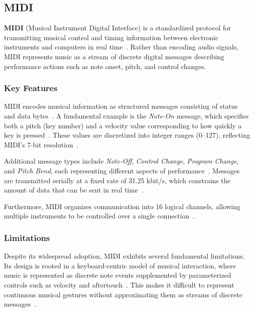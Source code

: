 \subsection{MIDI}\label{subsec:midi}

\textbf{MIDI} (Musical Instrument Digital Interface) is a standardized protocol for transmitting musical
control and timing information between electronic instruments and computers in real time~\cite{Moog_1986}.
Rather than encoding audio signals, MIDI represents music as a stream of discrete digital messages describing
performance actions such as note onset, pitch, and control changes.


\subsubsection{Key Features}

MIDI encodes musical information as structured messages consisting of status and data bytes~\cite{Moog_1986}.
A fundamental example is the \textit{Note-On} message, which specifies both a pitch (key number) and a
velocity value corresponding to how quickly a key is pressed~\cite{Moog_1986}.
These values are discretized into integer ranges (0–127), reflecting MIDI’s 7-bit resolution~\cite{Moog_1986}.

Additional message types include \textit{Note-Off}, \textit{Control Change}, \textit{Program Change}, and
\textit{Pitch Bend}, each representing different aspects of performance~\cite{Moog_1986}.
Messages are transmitted serially at a fixed rate of 31.25 kbit/s, which constrains the amount of data that
can be sent in real time~\cite{Moog_1986}.

Furthermore, MIDI organizes communication into 16 logical channels, allowing multiple instruments to be
controlled over a single connection~\cite{Moog_1986}.


\subsubsection{Limitations}

Despite its widespread adoption, MIDI exhibits several fundamental limitations.
Its design is rooted in a keyboard-centric model of musical interaction, where music is represented as
discrete note events supplemented by parameterized controls such as velocity and aftertouch~\cite{Moore_1988}.
This makes it difficult to represent continuous musical gestures without approximating them as streams of
discrete messages~\cite{Moore_1988}.

